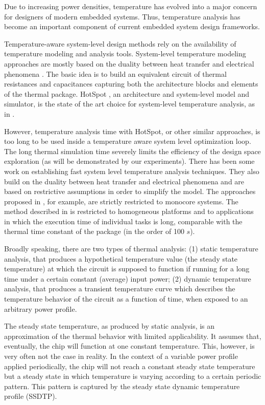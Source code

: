 Due to increasing power densities, temperature has evolved into a major concern for designers of modern embedded systems. Thus, temperature analysis has become an important component of current embedded system design frameworks.

Temperature-aware system-level design methods rely on the availability of temperature modeling and analysis tools. System-level temperature modeling approaches are mostly based on the duality between heat transfer and electrical phenomena \cite{kreith2000}. The basic idea is to build an equivalent circuit of thermal resistances and capacitances capturing both the architecture blocks and elements of the thermal package. HotSpot \cite{huang2003}, an architecture and system-level model and simulator, is the state of the art choice for system-level temperature analysis, as in \cite{srinivasan2004, liao2005, coskun2006, liu2007, huang2009, xiang2010, thiele2011}.

However, temperature analysis time with HotSpot, or other similar approaches, is too long to be used inside a temperature aware system level optimization loop. The long thermal simulation time severely limits the efficiency of the design space exploration (as will be demonstrated by our experiments). There has been some work on establishing fast system level temperature analysis techniques. They also build on the duality between heat transfer and electrical phenomena and are based on restrictive assumptions in order to simplify the model. The approaches proposed in \cite{rai2011, bao2010}, for example, are strictly restricted to monocore systems. The method described in \cite{rao2009} is restricted to homogeneous platforms and to applications in which the execution time of individual tasks is long, comparable with the thermal time constant of the package (in the order of 100 $s$).

Broadly speaking, there are two types of thermal analysis: (1) static temperature analysis, that produces a hypothetical temperature value (the steady state temperature) at which the circuit is supposed to function if running for a long time under a certain constant (average) input power; (2) dynamic temperature analysis, that produces a transient temperature curve which describes the temperature behavior of the circuit as a function of time, when exposed to an arbitrary power profile.

The steady state temperature, as produced by static analysis, is an approximation of the thermal behavior with limited applicability. It assumes that, eventually, the chip will function at one constant temperature.  This, however, is very often not the case in reality. In the context of a variable power profile applied periodically, the chip will not reach a constant steady state temperature but a steady state in which temperature is varying according to a certain periodic pattern. This pattern is captured by the steady state dynamic temperature profile (SSDTP).

